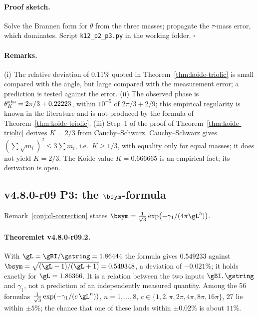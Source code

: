 \paragraph{Proof sketch.}
Solve the Brannen form for \(\theta\) from the three masses; propagate the \(\tau\)-mass error, which
dominates.  Script \texttt{k12\_p2\_p3.py} in the working folder.  \(\square\)

\paragraph{Remarks.}
(i) The relative deviation of \(0.11\%\) quoted in Theorem~\ref{thm:koide-triolic} is small compared with
the angle, but large compared with the measurement error; a prediction is tested against the error.
(ii) The observed phase is \(\theta_K^{\rm obs}=2\pi/3+0.22223\), within \(10^{-5}\) of
\(2\pi/3+2/9\); this empirical regularity is known in the literature and is not produced by the formula
of Theorem~\ref{thm:koide-triolic}.
(iii) Step~1 of the proof of Theorem~\ref{thm:koide-triolic} derives \(K=2/3\) from Cauchy--Schwarz.
Cauchy--Schwarz gives \((\sum\sqrt{m_i})^2\le3\sum m_i\), i.e.\ \(K\ge1/3\), with equality only for equal
masses; it does not yield \(K=2/3\).  The Koide value \(K=0.666665\) is an empirical fact; its derivation
is open.

\subsection*{v4.8.0-r09 P3: the \texorpdfstring{$\bsym$}{beta}-formula}
\label{subsec:v480-r09-p3}

Remark~\ref{conj:cl-correction} states \(\bsym=\tfrac1{\sqrt3}\exp\bigl(-\gamma_1/(4\pi\gL^5)\bigr)\).

\paragraph{Theoremlet v4.8.0-r09.2.}
With \(\gL=\gBI/\gstring=1.86444\) the formula gives \(0.549233\) against
\(\bsym=\sqrt{(\gL-1)/(\gL+1)}=0.549348\), a deviation of \(-0.021\%\); it holds exactly for
\(\gL=1.86366\).  It is a relation between the two inputs \(\gBI,\gstring\) and \(\gamma_1\), not a
prediction of an independently measured quantity.  Among the 56 formulas
\(\tfrac1{\sqrt3}\exp(-\gamma_1/(c\,\gL^n))\), \(n=1,\dots,8\),
\(c\in\{1,2,\pi,2\pi,4\pi,8\pi,16\pi\}\), 27 lie within \(\pm5\%\); the chance that one of these lands
within \(\pm0.02\%\) is about \(11\%\).

